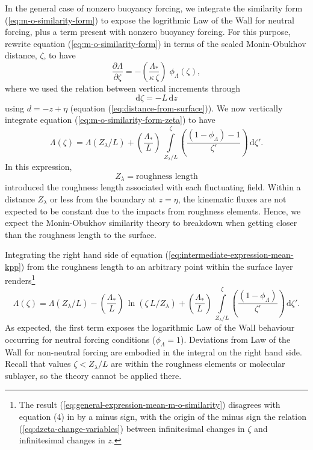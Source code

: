 In the general case of nonzero buoyancy forcing, we integrate the
similarity form (\ref{eq:m-o-similarity-form}) to expose the
logrithmic Law of the Wall for neutral forcing, plus a term present
with nonzero buoyancy forcing.  For this purpose, rewrite equation
(\ref{eq:m-o-similarity-form}) in terms of the scaled Monin-Obukhov
distance, $\zeta$, to have
\begin{equation}
  \frac{\partial \Lambda}{\partial \zeta} = -\left( \frac{\Lambda_{*}}{\kappa \, \zeta} \right) \; \phi_{\Lambda}(\zeta),
\label{eq:m-o-similarity-form-zeta}
\end{equation}
where we used the relation between vertical increments through
\begin{equation}
 \mathrm{d}\zeta = - L \, \mathrm{d}z
\label{eq:dzeta-change-variables}
\end{equation}
using $d=-z+\eta$ (equation (\ref{eq:distance-from-surface})).  We now
vertically integrate equation (\ref{eq:m-o-similarity-form-zeta}) to
have
\begin{equation}
 \Lambda(\zeta) = \Lambda(Z_{\lambda}/L)  
 +\left( \frac{\Lambda_{*}}{L} \right) \,
 \int\limits_{Z_{\lambda}/L}^{\zeta} \left(\frac{ (1-\phi_{\Lambda}) - 1}{\zeta'} \right) \, \mathrm{d}\zeta'.
\label{eq:intermediate-expression-mean-kpp}
\end{equation}
 In this expression, 
\begin{equation}
 Z_{\lambda} = \mbox{roughness length}
\label{eq:roughness-length-defined}
\end{equation}
introduced the roughness length associated with each fluctuating
field.  Within a distance $Z_{\lambda}$ or less from the boundary at
$z=\eta$, the kinematic fluxes are not expected to be constant due to
the impacts from roughness elements.  Hence, we expect the
Monin-Obukhov similarity theory to breakdown when getting closer than
the roughness length to the surface.

Integrating the right hand side of equation
(\ref{eq:intermediate-expression-mean-kpp}) from the roughness length
to an arbitrary point within the surface layer renders\footnote{The
  result (\ref{eq:general-expression-mean-m-o-similarity}) disagrees
  with equation (4) in \cite{LargeKPP} by a minus sign, with the
  origin of the minus sign the relation
  (\ref{eq:dzeta-change-variables}) between infinitesimal changes in
  $\zeta$ and infinitesimal changes in $z$.}
\begin{equation}
 \Lambda(\zeta) = \Lambda(Z_{\lambda}/L)   
 -\left( \frac{\Lambda_{*}}{L} \right) \, \ln(\zeta \, L/Z_{\lambda})
 +
  \left( \frac{\Lambda_{*}}{L} \right) \,
  \int\limits_{Z_{\lambda}/L}^{\zeta} \left(\frac{ (1-\phi_{\Lambda})}{\zeta'} \right) \, \mathrm{d}\zeta'.
\label{eq:general-expression-mean-m-o-similarity}
\end{equation}
As expected, the first term exposes the logarithmic Law of the Wall
behaviour occurring for neutral forcing conditions ($\phi_{\Lambda} =
1$).  Deviations from Law of the Wall for non-neutral forcing are
embodied in the integral on the right hand side.  Recall that values
$\zeta < Z_{\lambda}/L$ are within the roughness elements or molecular
sublayer, so the theory cannot be applied there.

